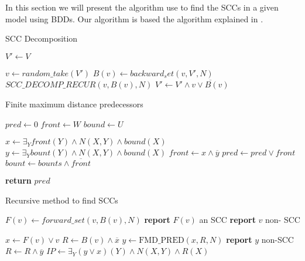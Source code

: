 \documentclass[11pt]{article}
\begin{document}
        In this section we will present the algorithm use to find the SCCs in
        a given model using BDDs. Our algorithm is based the algorithm explained
        in \cite{scc}.

        \begin{multicols}{2}
        \begin{algorithm}[H]
            \caption{SCC Decomposition}\label{scc}
                \State $V' \gets V$

                    \State $v \gets random\_take(V')$
                    \State $B(v) \gets backward_set(v, V', N)$
                    \State $SCC\_DECOMP\_RECUR(v, B(v), N)$
                    \State $V' \gets V' \wedge \overline{v \vee B(v)}$
                \EndWhile
            \EndProcedure
        \end{algorithm}

        \begin{algorithm}[H]
            \caption{Finite maximum distance predecessors}\label{fmd}
                \State $pred \gets 0$
                \State $front \gets W$
                \State $bound \gets U$
                
                    \State $x \gets \exists_Y front(Y)\wedge N(X, Y) \wedge bound(X)$
                    \State $y \gets \exists_Y bount(Y)\wedge N(X, Y) \wedge bound(X)$
                    \State $front \gets x \wedge \overline{y}$
                    \State $pred \gets pred \vee front$
                    \State $bount \gets bounts \wedge \overline{front}$
                \EndWhile

                \State \textbf{return} $pred$
            \EndProcedure
        \end{algorithm}

        \begin{algorithm}[H]
            \caption{Recursive method to find SCCs}\label{recursiveSCC}
                \State $F(v) \gets forward\_set(v, B(v), N)$
                    \State \textbf{report} $F(v)$ an SCC
                \Else
                    \State \textbf{report} $v$ non- SCC
                \EndIf

                \State $x \gets F(v) \vee v$
                \State $R \gets B(v) \wedge \overline{x}$
                \State $y \gets \text{FMD\_PRED}(x, R, N)$
                \State \textbf{report} $y$ non-SCC
                \State $R \gets R \wedge \overline{y}$
                \State $IP \gets \exists_Y (y\vee x)(Y)\wedge N(X,Y) \wedge R(X)$
                

\end{algorithm}
\end{multicols}
\end{document}
